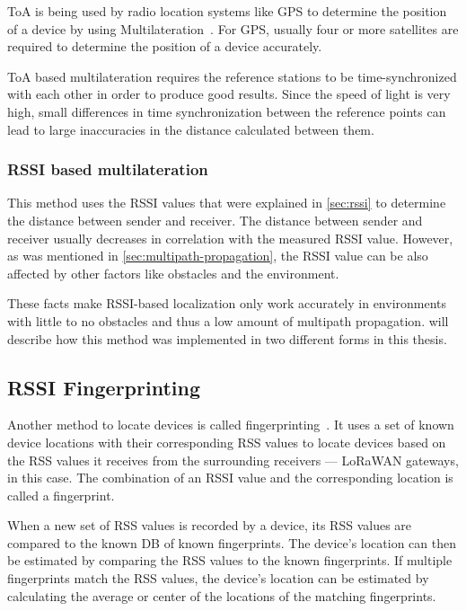 \ac{ToA} is being used by radio location systems like \ac{GPS} to determine the position of a device by using Multilateration~\cite{department_of_defense_usa_gps_2020}.
For GPS, usually four or more satellites are required to determine the position of a device accurately.

\ac{ToA} based multilateration requires the reference stations to be time-synchronized with each other in order to produce good results.
Since the speed of light is very high, small differences in time synchronization between the reference points can lead to large inaccuracies in the distance calculated between them.

\subsubsection{\acf{RSSI} based multilateration}\label{sec:rssi-based-multilateration}

This method uses the \acf{RSSI} values that were explained in \cref{sec:rssi} to determine the distance between sender and receiver.
The distance between sender and receiver usually decreases in correlation with the measured \ac{RSSI} value.
However, as was mentioned in \cref{sec:multipath-propagation}, the \ac{RSSI} value can be also affected by other factors like obstacles and the environment.

These facts make \ac{RSSI}-based localization only work accurately in environments with little to no obstacles and thus a low amount of multipath propagation.
 will describe how this method was implemented in two different forms in this thesis.

\subsection{\acs{RSSI} Fingerprinting}\label{sec:rssi-fingerprinting}

Another method to locate devices is called fingerprinting~\cite{xia_indoor_2017}.
It uses a set of known device locations with their corresponding \ac{RSS} values to locate devices based on the \ac{RSS} values it receives from the surrounding receivers --- \ac{LoRaWAN} gateways, in this case.
The combination of an \ac{RSSI} value and the corresponding location is called a fingerprint.

When a new set of \ac{RSS} values is recorded by a device, its \ac{RSS} values are compared to the known \ac{DB} of known fingerprints.
The device's location can then be estimated by comparing the \ac{RSS} values to the known fingerprints.
If multiple fingerprints match the \ac{RSS} values, the device's location can be estimated by calculating the average or center of the locations of the matching fingerprints.

